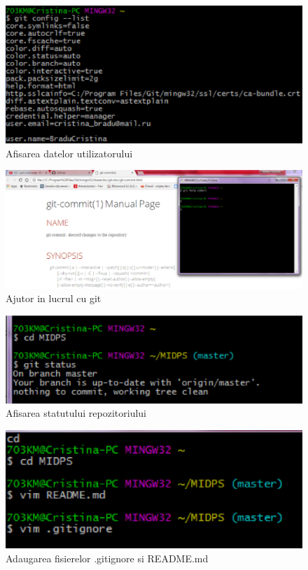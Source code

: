 \documentclass[11pt]{article}
\begin{document}
\begin{figure}[h]
\includegraphics{images/2.eps}
\caption{Afisarea datelor utilizatorului}
\end{figure}

\begin{figure}[h]
\includegraphics{images/3.eps}
\caption{Ajutor in lucrul cu git}
\end{figure}

\begin{figure}[h]
\includegraphics{images/4.eps}
\caption{Afisarea statutului repozitoriului}
\end{figure}

\begin{figure}[h]
\includegraphics{images/6.eps}
\caption{Adaugarea fisierelor .gitignore si README.md}
\end{figure}
\end{document}

